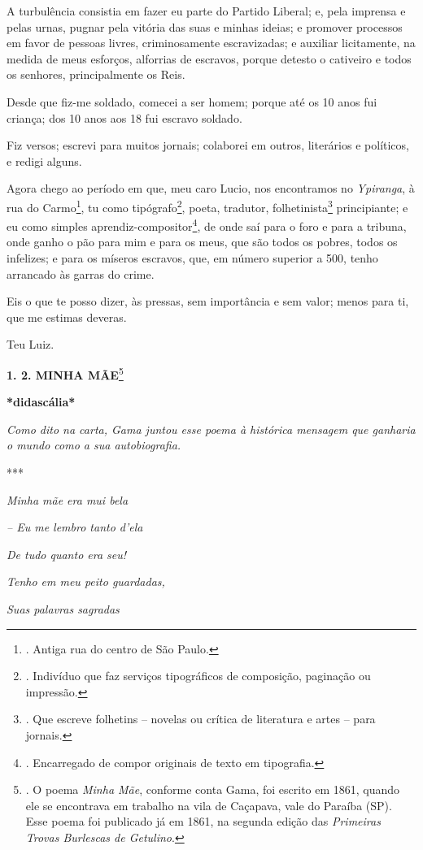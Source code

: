 A turbulência consistia em fazer eu parte do Partido Liberal; e, pela
imprensa e pelas urnas, pugnar pela vitória das suas e minhas ideias; e
promover processos em favor de pessoas livres, criminosamente
escravizadas; e auxiliar licitamente, na medida de meus esforços,
alforrias de escravos, porque detesto o cativeiro e todos os senhores,
principalmente os Reis.

Desde que fiz-me soldado, comecei a ser homem; porque até os 10 anos fui
criança; dos 10 anos aos 18 fui escravo soldado.

Fiz versos; escrevi para muitos jornais; colaborei em outros, literários
e políticos, e redigi alguns.

Agora chego ao período em que, meu caro Lucio, nos encontramos no
\emph{Ypiranga}, à rua do Carmo\footnote{. Antiga rua do centro de São
  Paulo.}, tu como tipógrafo\footnote{. Indivíduo que faz serviços
  tipográficos de composição, paginação ou impressão.}, poeta, tradutor,
folhetinista\footnote{. Que escreve folhetins -- novelas ou crítica de
  literatura e artes -- para jornais.} principiante; e eu como simples
aprendiz-compositor\footnote{. Encarregado de compor originais de texto
  em tipografia.}, de onde
saí para o foro e para a tribuna, onde ganho o pão para mim e para os
meus, que são todos os pobres, todos os infelizes; e para os míseros
escravos, que, em número superior a 500, tenho arrancado às garras do
crime.

Eis o que te posso dizer, às pressas, sem importância e sem valor; menos
para ti, que me estimas deveras.

Teu Luiz.

\textbf{1. 2. MINHA MÃE}\footnote{. O poema \emph{Minha Mãe}, conforme
  conta Gama, foi escrito em 1861, quando ele se encontrava em trabalho
  na vila de Caçapava, vale do Paraíba (SP). Esse poema foi publicado já
  em 1861, na segunda edição das \emph{Primeiras Trovas Burlescas de
  Getulino}.}

\textbf{*didascália*}

\emph{Como dito na carta, Gama juntou esse poema à histórica mensagem
que ganharia o mundo como a sua autobiografia. }

***

\emph{Minha mãe era mui bela}

\emph{-- Eu me lembro tanto d'ela}

\emph{De tudo quanto era seu!}

\emph{Tenho em meu peito guardadas,}

\emph{Suas palavras sagradas}

